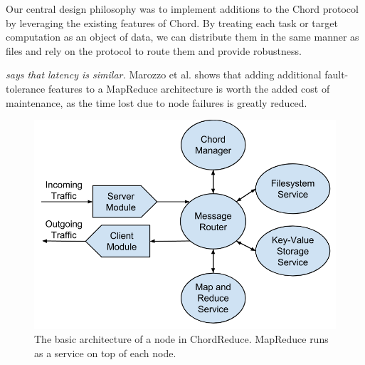 

Our central design philosophy was to implement additions to the Chord protocol by leveraging the existing features of Chord.  By treating each task or target computation as an object of data, we can distribute them in the same manner as files and rely on the protocol to route them and provide robustness.

\textit{\cite{leemap} says that latency is similar.}  Marozzo et al. \cite{marozzo2012p2p} shows that adding additional fault-tolerance features to a MapReduce architecture is worth the added cost of maintenance, as the time lost due to node failures is greatly reduced.

\begin{figure}
    \includegraphics[width=\linewidth]{crArch}
    \caption{The basic architecture of a node in ChordReduce.  MapReduce runs as a service on top of each node.}
    \label{crArch}
\end{figure}




